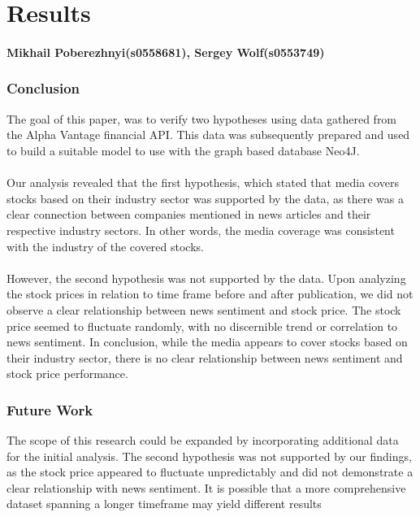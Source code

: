 \chapter{Results}
\label{cha:results}
\subsubsection*{Mikhail Poberezhnyi(s0558681), Sergey Wolf(s0553749)}

\subsection{Conclusion}
\label{cha:conclusion}
The goal of this paper, was to verify two hypotheses using data gathered from the Alpha Vantage financial API. This data was subsequently prepared and used to build a suitable model to use with the graph based database Neo4J. \\
\\
Our analysis revealed that the first hypothesis, which stated that media covers stocks based on their industry sector was supported by the data, as there was a clear connection between companies mentioned in news articles and their respective industry sectors. In other words, the media coverage was consistent with the industry of the covered stocks.\\
\\
However, the second hypothesis was not supported by the data. Upon analyzing the stock prices in relation to time frame before and after publication, we did not observe a clear relationship between news sentiment and stock price. The stock price seemed to fluctuate randomly, with no discernible trend or correlation to news sentiment. In conclusion, while the media appears to cover stocks based on their industry sector, there is no clear relationship between news sentiment and stock price performance.



\subsection{Future Work}
\label{cha:future-work}

The scope of this research could be expanded by incorporating additional data for the initial analysis. The second hypothesis was not supported by our findings, as the stock price appeared to fluctuate unpredictably and did not demonstrate a clear relationship with news sentiment. It is possible that a more comprehensive dataset spanning a longer timeframe may yield different results






